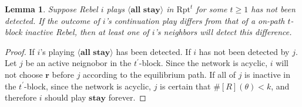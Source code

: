 \documentclass[12pt,letter]{article}
\newcommand{\Kappa}{\mathrm{Coord}}
\newcommand{\Omicron}{\mathrm{Rpt}}
\newtheorem{lemma}{Lemma}[section]
\theoremstyle{definition}
\theoremstyle{remark}
\theoremstyle{claim}
\begin{document}




\begin{lemma}Suppose Rebel $i$ plays $\langle \textbf{all stay} \rangle$ in $\Omicron^t$ for some $t\geq 1$ has not been detected. If the outcome of $i$'s continuation play differs from that of a on-path $t$-block inactive Rebel, then at least one of $i$'s neighbors will detect this difference.
\end{lemma}
\begin{proof}
If $i$'s playing $\langle \textbf{all stay}\rangle$ has been detected. If $i$ has not been detected by $j$. Let $j$ be an active neignobor in the $t^{'}$-block. Since the network is acyclic, $i$ will not choose $\textbf{r}$ before $j$ according to the equilibrium path. If all of $j$ is inactive in the $t^{'}$-block, since the network is acyclic, $j$ is certain that $\#[R](\theta)<k$, and therefore $i$ should play $\textbf{stay}$ forever. 
\end{proof}
\end{document}
